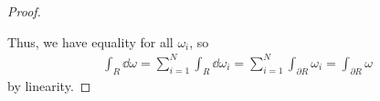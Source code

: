 \begin{proof}
\begin{itemize}
	\end{itemize}

	Thus, we have equality for all $ω_i$, so
	\begin{align}
		\int_R \dd ω = \sum_{i=1}^N \int_R \dd ω_i = \sum_{i=1}^N \int_{∂R} ω_i = \int_{∂R} ω
	\end{align}
	by linearity.
\end{proof}

